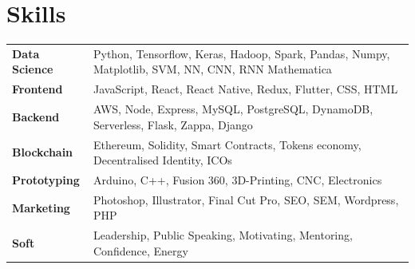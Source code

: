 \documentclass[11pt]{article}
\begin{document}
\section*{Skills}
\begin{tabularx}{\textwidth}{lX}
  \textbf{Data Science} & Python, Tensorflow, Keras, Hadoop,
                          Spark, Pandas, Numpy, Matplotlib, SVM,
                          NN, CNN, RNN
                          Mathematica \\
  \textbf{Frontend}     & JavaScript, React, React Native, Redux, Flutter, CSS, HTML  \\
  \textbf{Backend}      & AWS, Node, Express, MySQL, PostgreSQL, DynamoDB,
                          Serverless, Flask, Zappa, Django \\
  \textbf{Blockchain}   & Ethereum, Solidity, Smart Contracts,
                          Tokens economy,
                          Decentralised Identity, ICOs \\
  \textbf{Prototyping}  & Arduino, C++, Fusion 360, 3D-Printing,
                          CNC, Electronics \\
  \textbf{Marketing}    & Photoshop, Illustrator, Final Cut Pro, SEO, SEM, Wordpress, PHP \\
  \textbf{Soft}         & Leadership, Public Speaking, Motivating, Mentoring, Confidence, Energy
\end{tabularx}
\end{document}

